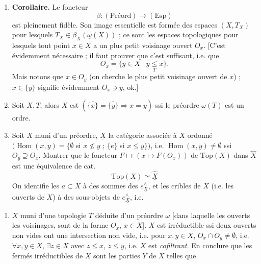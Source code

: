 \documentclass[11pt,a4paper]{article}
\begin{document}
\begin{enumerate}
\item[e)] \textbf{Corollaire.} Le foncteur
\[
\beta : (\text{Préord}) \longrightarrow (\mathrm{Esp})
\]
est pleinement fidèle. Son image essentielle est formée des espaces
$(X, T_{X})$ pour lesquels $T_{X} \in \beta_{X}(\underline{\omega}(X))$ ; ce sont
 les espaces topologiques pour lesquels tout point $x \in X$ a un
plus petit voisinage ouvert $O_{x}$. [C'est évidemment nécessaire ; il faut
prouver que c'est suffisant, i.e. que
\[
O_{x} = \{ y \in X \mid y \underset{T}{\leq} x \}.
\]
Mais \struck{\ill{}} notons que $x \in O_{y}$ \ill{} (on cherche le plus petit
voisinage ouvert de $x$) ; $x \in \overline{\{y\}}$ signifie évidemment \ill{}
$O_{x} \ni y$, ok.]

\item[f)] Soit \struck{\ill{}} $X, T$, alors $X$ est 
$(\overline{\{x\}} = \overline{\{y\}} \Rightarrow x = y)$ ssi le préordre
$\omega(T)$ est un ordre. \struck{\ill{}}

\item[g)]  Soit $X$ muni d'un préordre, $\underline{X}$ la catégorie
associée à $X$ ordonné
$\bigl( \operatorname{Hom}(x,y) = \{\emptyset$ si $x \not\leq y$ ;
$\{e\}$ si $x \leq y\} \bigr)$, i.e.
$\operatorname{Hom}(x,y) \neq \emptyset$ ssi $O_{y} \supseteq O_{x}$. Montrer que
le foncteur $F \mapsto (x \mapsto F(O_{x}))$ de $\mathrm{Top}(X)$ dans
$\widehat{\underline{X}}$ est une équivalence de cat.
\[
\mathrm{Top}(X) \simeq \widehat{\underline{X}}
\]
On identifie les $a \subset X$ à des sommes \ill{} des $e_{\underline{X}}^{\wedge}$,
et les cribles de $X$ (i.e. les ouverts de $X$) à des sous-objets de
$e_{\underline{X}}^{\wedge}$, i.e. \ill{}
\end{enumerate}

\begin{enumerate}
\item[g)] $X$ muni d'une topologie $T$ déduite d'un préordre $\omega$ [dans
laquelle les ouverts \ill{} les voisinages, sont de la forme $O_{x}$, $x \in X$].
$X$ est irréductible ssi deux ouverts non vides ont une intersection non vide,
i.e. pour $x, y \in X$, $O_{x} \cap O_{y} \neq \emptyset$, i.e.
$\forall x,y \in X$, $\exists z \in X$ avec $z \leq x$, $z \leq y$, i.e. $X$ est
\emph{cofiltrant}. En conclure que les fermés irréductibles de $X$ sont les
parties $Y$ de $X$ telles que
\end{enumerate}
\end{document}
